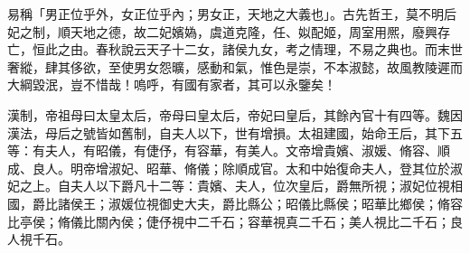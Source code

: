 
\begin{pinyinscope}
易稱「男正位乎外，女正位乎內；男女正，天地之大義也」。古先哲王，莫不明后妃之制，順天地之德，故二妃嬪媯，虞道克隆，任、姒配姬，周室用熈，廢興存亡，恒此之由。春秋說云天子十二女，諸侯九女，考之情理，不易之典也。而末世奢縱，肆其侈欲，至使男女怨曠，感動和氣，惟色是崇，不本淑懿，故風教陵遲而大綱毀泯，豈不惜哉！嗚呼，有國有家者，其可以永鑒矣！

漢制，帝祖母曰太皇太后，帝母曰皇太后，帝妃曰皇后，其餘內官十有四等。魏因漢法，母后之號皆如舊制，自夫人以下，世有增損。太祖建國，始命王后，其下五等：有夫人，有昭儀，有倢伃，有容華，有美人。文帝增貴嬪、淑媛、脩容、順成、良人。明帝增淑妃、昭華、脩儀；除順成官。太和中始復命夫人，登其位於淑妃之上。自夫人以下爵凡十二等：貴嬪、夫人，位次皇后，爵無所視；淑妃位視相國，爵比諸侯王；淑媛位視御史大夫，爵比縣公；昭儀比縣侯；昭華比鄉侯；脩容比亭侯；脩儀比關內侯；倢伃視中二千石；容華視真二千石；美人視比二千石；良人視千石。


\end{pinyinscope}